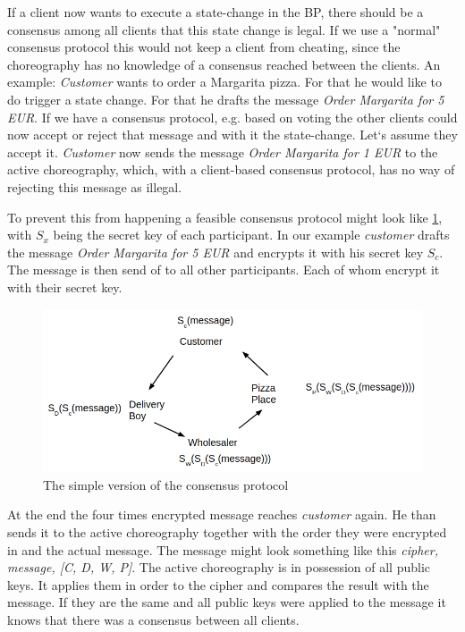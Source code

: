 \documentclass[runningheads]{llncs}
\begin{document}
If a client now wants to execute a state-change in the BP, there should be a consensus among all clients that this state change is legal. If we use a "normal" consensus protocol this would not keep a client from cheating, since the choreography has no knowledge of a consensus reached between the clients. An example: \textit{Customer} wants to order a Margarita pizza. For that he would like to do trigger a state change. For that he drafts the message \textit{Order Margarita for 5 EUR}. If we have a consensus protocol, e.g. based on voting the other clients could now accept or reject that message and with it the state-change. Let`s assume they accept it. \textit{Customer} now sends the message \textit{Order Margarita for 1 EUR} to the active choreography, which, with a client-based consensus protocol, has no way of rejecting this message as illegal. 

To prevent this from happening a feasible consensus protocol might look like \ref{fig:simple}, with $S_x$ being the secret key of each participant. In our example \textit{customer} drafts the message \textit{Order Margarita for 5 EUR} and encrypts it with his secret key $S_c$. The message is then send of to all other participants. Each of whom encrypt it with their secret key. 


\begin{figure}
    \centering
    \includegraphics[scale=0.6]{simple_consensus.png}
    \caption{The simple version of the consensus protocol}
    \label{fig:simple}
\end{figure}


At the end the four times encrypted message reaches \textit{customer} again. He than sends it to the active choreography together with the order they were encrypted in and the actual message. The message might look something like this \textit{cipher, message, [C, D, W, P]}. The active choreography is in possession of all public keys. It applies them in order to the cipher and compares the result with the message. If they are the same and all public keys were applied to the message it knows that there was a consensus between all clients. 
\end{document}
